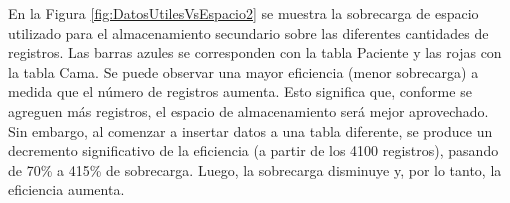 





En la Figura \ref{fig:DatosUtilesVsEspacio2} se muestra la sobrecarga de espacio utilizado para el almacenamiento secundario sobre las diferentes cantidades de registros. Las barras azules se corresponden con la tabla Paciente y las rojas con la tabla Cama. Se puede observar una mayor eficiencia (menor sobrecarga) a medida que el número de registros aumenta. Esto significa que, conforme se agreguen más registros, el espacio de almacenamiento será mejor aprovechado. Sin embargo, al comenzar a insertar datos a una tabla diferente, se produce un decremento significativo de la eficiencia (a partir de los 4100 registros), pasando de 70\% a 415\% de sobrecarga. Luego, la sobrecarga disminuye y, por lo tanto, la eficiencia aumenta.


